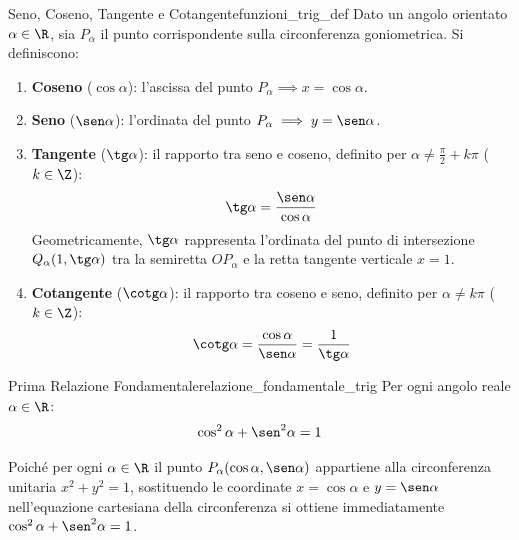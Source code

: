 \begin{definizione}{Seno, Coseno, Tangente e Cotangente}{funzioni_trig_def}
Dato un angolo orientato $\alpha \in \R$, sia $P_\alpha$ il punto corrispondente sulla circonferenza goniometrica. Si definiscono:
\begin{enumerate}
    \item \textbf{Coseno} ($\cos \alpha$): l'ascissa del punto $P_\alpha \implies x = \cos \alpha$.
    \item \textbf{Seno} ($\sen \alpha$): l'ordinata del punto $P_\alpha \implies y = \sen \alpha$.
    \item \textbf{Tangente} ($\tg \alpha$): il rapporto tra seno e coseno, definito per $\alpha \neq \frac{\pi}{2} + k\pi$ ($k \in \Z$):
    \[
        \tg \alpha = \frac{\sen \alpha}{\cos \alpha}
    \]
    Geometricamente, $\tg \alpha$ rappresenta l'ordinata del punto di intersezione $Q_\alpha(1, \tg \alpha)$ tra la semiretta $OP_\alpha$ e la retta tangente verticale $x = 1$.
    \item \textbf{Cotangente} ($\cotg \alpha$): il rapporto tra coseno e seno, definito per $\alpha \neq k\pi$ ($k \in \Z$):
    \[
        \cotg \alpha = \frac{\cos \alpha}{\sen \alpha} = \frac{1}{\tg \alpha}
    \]
\end{enumerate}
\end{definizione}

\begin{teorema}{Prima Relazione Fondamentale}{relazione_fondamentale_trig}
Per ogni angolo reale $\alpha \in \R$:
\[
    \cos^2 \alpha + \sen^2 \alpha = 1
\]
\end{teorema}

\begin{dimostrazione}
Poiché per ogni $\alpha \in \R$ il punto $P_\alpha(\cos \alpha, \sen \alpha)$ appartiene alla circonferenza unitaria $x^2 + y^2 = 1$, sostituendo le coordinate $x = \cos \alpha$ e $y = \sen \alpha$ nell'equazione cartesiana della circonferenza si ottiene immediatamente $\cos^2 \alpha + \sen^2 \alpha = 1$.
\end{dimostrazione}

